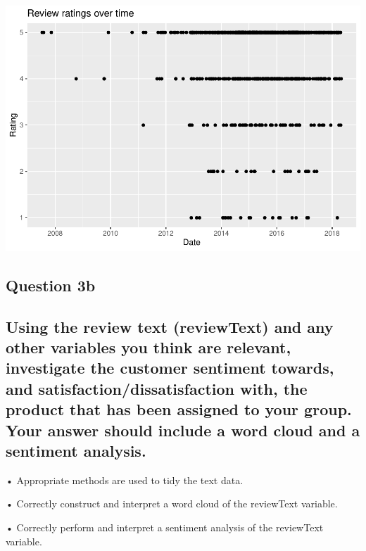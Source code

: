 \documentclass[
  11pt,
]{article}
\begin{document}
\includegraphics{Assignment-STAT702_files/figure-latex/3a plots-4.pdf}

\hypertarget{question-3b}{%
\subsection{Question 3b}\label{question-3b}}

\hypertarget{using-the-review-text-reviewtext-and-any-other-variables-you-think-are-relevant-investigate-the-customer-sentiment-towards-and-satisfactiondissatisfaction-with-the-product-that-has-been-assigned-to-your-group.-your-answer-should-include-a-word-cloud-and-a-sentiment-analysis.}{%
\subsection{Using the review text (reviewText) and any other variables
you think are relevant, investigate the customer sentiment towards, and
satisfaction/dissatisfaction with, the product that has been assigned to
your group. Your answer should include a word cloud and a sentiment
analysis.}\label{using-the-review-text-reviewtext-and-any-other-variables-you-think-are-relevant-investigate-the-customer-sentiment-towards-and-satisfactiondissatisfaction-with-the-product-that-has-been-assigned-to-your-group.-your-answer-should-include-a-word-cloud-and-a-sentiment-analysis.}}

• Appropriate methods are used to tidy the text data.

• Correctly construct and interpret a word cloud of the reviewText
variable.

• Correctly perform and interpret a sentiment analysis of the reviewText
variable.
\end{document}
